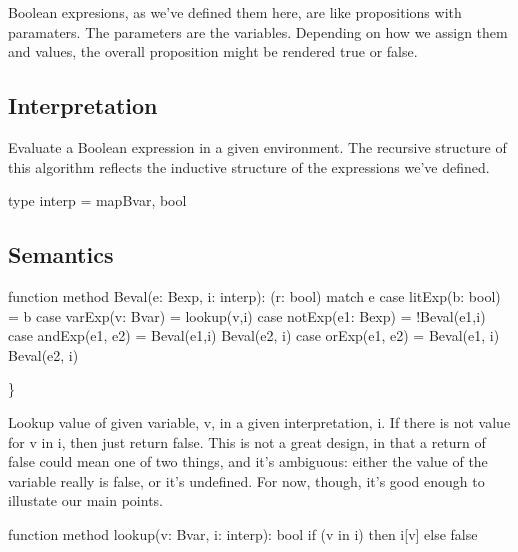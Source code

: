 \documentclass[letterpaper,10pt,english]{sphinxmanual}
\begin{document}
Boolean expresions, as we’ve defined them here, are like propositions
with paramaters. The parameters are the variables. Depending on how we
assign them  and  values, the overall proposition might be
rendered true or false.


\subsection{Interpretation}
\label{\detokenize{09-propositional-logic:interpretation}}
Evaluate a Boolean expression in a given environment.  The recursive
structure of this algorithm reflects the inductive structure of the
expressions we’ve defined.

\begin{sphinxVerbatim}[commandchars=\\\{\}]
type interp = map\PYGZlt{}Bvar, bool\PYGZgt{}
\end{sphinxVerbatim}


\subsection{Semantics}
\label{\detokenize{09-propositional-logic:semantics}}
\begin{sphinxVerbatim}[commandchars=\\\{\}]
function method Beval(e: Bexp, i: interp): (r: bool)
\PYGZob{}
    match e
    \PYGZob{}
        case litExp(b: bool) =\PYGZgt{} b
        case varExp(v: Bvar) =\PYGZgt{} lookup(v,i)
        case notExp(e1: Bexp) =\PYGZgt{} !Beval(e1,i)
        case andExp(e1, e2) =\PYGZgt{} Beval(e1,i) \PYGZam{}\PYGZam{} Beval(e2, i)
        case orExp(e1, e2) =\PYGZgt{}  Beval(e1, i) \textbar{}\textbar{} Beval(e2, i)
    \PYGZcb{}
\PYGZcb{}
\end{sphinxVerbatim}

\}

Lookup value of given variable, v, in a given interpretation, i. If
there is not value for v in i, then just return false. This is not a
great design, in that a return of false could mean one of two things,
and it’s ambiguous: either the value of the variable really is false,
or it’s undefined.  For now, though, it’s good enough to illustate our
main points.

\begin{sphinxVerbatim}[commandchars=\\\{\}]
function method lookup(v: Bvar, i: interp): bool
\PYGZob{}
    if (v in i) then i[v]
    else false
\PYGZcb{}
\end{sphinxVerbatim}
\end{document}
